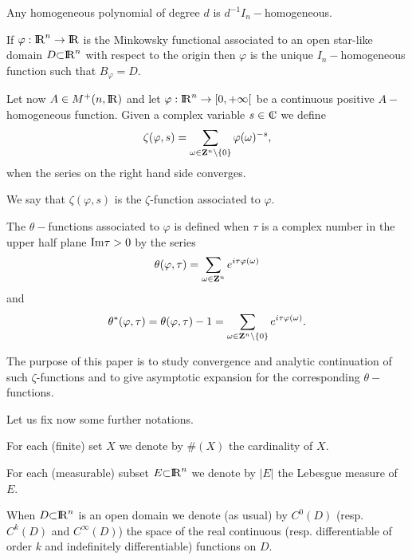 \documentclass[12pt,a4paper]{amsart}
\begin{document}
Any homogeneous polynomial of degree $d$
is $d^{-1}I_{n}-$homogeneous.

If ${\varphi}:{{\rm I\kern-.185em R}}^{n}\to{{\rm I\kern-.185em R}}$ is 
the Minkowsky functional associated to an open star-like domain
${D}{\subset}{{\rm I\kern-.185em R}}^{n}$ with respect to the origin
then ${\varphi}$ is the unique $I_{n}-$homogeneous function
such that ${B}_{\varphi}={D}$.

Let now ${A}\in{{{M}^+}({n},{{\rm I\kern-.185em R}})}$ and
let ${\varphi}:{{\rm I\kern-.185em R}}^{n}\to[0,+\infty[$ be
a continuous positive ${A}-$homogeneous function.
Given a complex variable $s\in{{\rm\kern.37em\vrule height1.4ex width.05em depth-.011em\kern-.37em C}}$ we define
\begin{equation}\label{eq::ZetaSeries}
	{\zeta}({\varphi},{s})=
	\sum_{{\omega}\in{{\bf Z}}^{n}\setminus\{0\}}{\varphi}({\omega})^{-{s}},
\end{equation}
when the series on the right hand side converges.

We say that ${\zeta}({\varphi},{s})$ is the
${\zeta}$-function associated to ${\varphi}$.

The $\theta-$functions associated to ${\varphi}$ is defined
when $\tau$ is a complex number in the upper half plane ${\mathop{\rm Im}\nolimits}\tau>0$
by the series
\begin{equation}\label{eq::ZetaSeries}
	\theta({\varphi},\tau)=
	\sum_{{\omega}\in{{\bf Z}}^{n}}e^{i\tau{\varphi}({\omega})}
\end{equation}
and
\begin{equation}\label{eq::ZetaSeries}
	\theta^*({\varphi},\tau)=\theta({\varphi},\tau)-1=
	\sum_{{\omega}\in{{\bf Z}}^{n}\setminus\{0\}}e^{i\tau{\varphi}({\omega})}.
\end{equation}

The purpose of this paper is to study
convergence and analytic continuation of such ${\zeta}$-functions
and to give asymptotic expansion for the corresponding 
$\theta-$functions.

Let us fix now some further notations.

For each (finite) set $X$ we denote by $\#(X)$ the cardinality of $X$.

For each (measurable) subset ${E}{\subset}{{\rm I\kern-.185em R}}^{n}$
we denote by $|{E}|$ the Lebesgue measure of ${E}$.

When ${D}{\subset}{{\rm I\kern-.185em R}}^{n}$ is an open domain
we denote (as usual) by $C^0({D})$
(resp. $C^{k}({D})$ and $C^\infty({D})$)
the space of the real continuous
(resp. differentiable of order ${k}$
and indefinitely differentiable)
functions on ${D}$.
\end{document}
